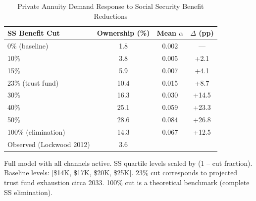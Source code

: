 \begin{table}[htbp]
\centering
\caption{Private Annuity Demand Response to Social Security Benefit Reductions}
\label{tab:ss_cut}
\begin{tabular}{lccc}
\toprule
SS Benefit Cut & Ownership (\%) & Mean $\alpha$ & $\Delta$ (pp) \\
\midrule
0\% (baseline) & 1.8 & 0.002 & --- \\
10\% & 3.8 & 0.005 & +2.1 \\
15\% & 5.9 & 0.007 & +4.1 \\
23\% (trust fund) & 10.4 & 0.015 & +8.7 \\
30\% & 16.3 & 0.030 & +14.5 \\
40\% & 25.1 & 0.059 & +23.3 \\
50\% & 28.6 & 0.084 & +26.8 \\
100\% (elimination) & 14.3 & 0.067 & +12.5 \\
\midrule
Observed (Lockwood 2012) & 3.6 & & \\
\bottomrule
\end{tabular}
\begin{tablenotes}
\small
\item Full model with all channels active. SS quartile levels
scaled by (1 -- cut fraction). Baseline levels: [\$14K, \$17K, \$20K, \$25K].
23\% cut corresponds to projected trust fund exhaustion circa 2033.
100\% cut is a theoretical benchmark (complete SS elimination).
\end{tablenotes}
\end{table}
